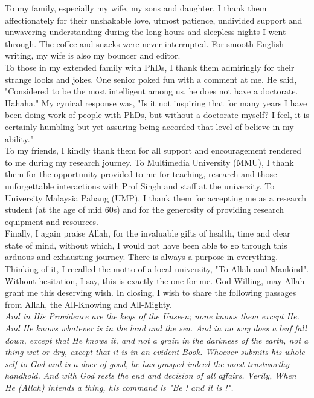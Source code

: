 \begin{singlespace}
\noindent
To my family, especially my wife, my sons and daughter, I thank them affectionately for their unshakable love, utmost patience, undivided support and unwavering understanding during the long hours and sleepless nights I went through. The coffee and snacks were never interrupted. For smooth English writing, my wife is also my bouncer and editor. \\

\noindent
To those in my extended family with PhDs, I thank them admiringly for their strange looks and jokes. One senior poked fun with a comment at me. He said, "Considered to be the most intelligent among us, he does not have a doctorate. Hahaha." My cynical response was, "Is it not inspiring that for many years I have been doing work of people with PhDs, but without a doctorate myself? I feel, it is certainly humbling but yet assuring being accorded that level of believe in my ability."\\

\noindent
To my friends, I kindly thank them for all support and encouragement rendered to me during my research journey. To Multimedia University (MMU), I thank them for the opportunity provided to me for teaching, research and those unforgettable interactions with Prof Singh and staff at the university. To University Malaysia Pahang (UMP), I thank them for accepting me as a research student (at the age of mid 60s) and for the generosity of providing research equipment and resources.\\

\noindent
Finally, I again praise Allah, for the invaluable gifts of health, time and clear state of mind, without which, I would not have been able to go through this arduous and exhausting journey. There is always a purpose in everything. Thinking of it, I recalled the motto of a local university, "To Allah and Mankind". Without hesitation, I say, this is exactly the one for me. God Willing, may Allah grant me this deserving wish. In closing, I wish to share the following passages from Allah, the All-Knowing and All-Mighty. \\

\noindent
\textit{And in His Providence are the keys of the Unseen; none knows them except He. And He knows whatever is in the land and the sea. And in no way does a leaf fall down, except that He knows it, and not a grain in the darkness of the earth, not a thing wet or dry, except that it is in an evident Book. Whoever submits his whole self to God and is a doer of good, he has grasped indeed the most trustworthy handhold. And with God rests the end and decision of all affairs. Verily, When He (Allah) intends a thing, his command is "Be ! and it is !".}  \\


\end{singlespace}
